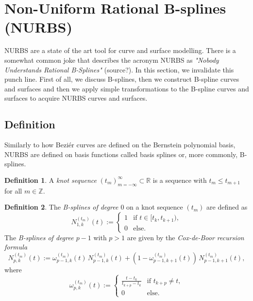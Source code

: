 \documentclass[a4paper, 11pt]{report}
\theoremstyle{definition}
\newtheorem{definition}{Definition}[section]
\renewcommand{\emph}[1]{\textit{#1}}
\begin{document}
\section{Non-Uniform Rational B-splines (NURBS)}
	NURBS are a state of the art tool for curve and surface modelling. There is a somewhat common joke that describes the acronym NURBS as \emph{"Nobody Understands Rational B-Splines"} (source?). In this section, we invalidate this punch line. First of all, we discuss B-splines, then we construct B-spline curves and surfaces and then we apply simple transformations to the B-spline curves and surfaces to acquire NURBS curves and surfaces.

\subsection{Definition}
	Similarly to how Beziér curves are defined on the Bernstein polynomial basis, NURBS are defined on basis functions called basis splines or, more commonly, B-splines.

	\begin{definition}
		A \emph{knot sequence} $(t_m)_{m=-\infty}^{\infty} \subset \mathbb{R}$ is a sequence with $t_{m} \leq t_{m+1}$ for all $m \in \mathbb{Z}$.
	\end{definition}

	\begin{definition}
		The \emph{B-splines of degree $0$} on a knot sequence $(t_m)$ are defined as
		\begin{equation}
			N^{(t_m)}_{1,k}(t) :=
			\begin{cases}
				1 & \text{if } t \in [t_k, t_{k+1}),\\
				0 & \text{else.}
			\end{cases}
		\end{equation}
		The \emph{B-splines of degree $p-1$} with $p > 1$ are given by the \emph{Cox-de-Boor recursion formula}
		\begin{equation}\label{eq:coxdeboorrec}
			N_{p,k}^{(t_m)}(t) := \omega^{(t_m)}_{p-1, k}(t) \, N^{(t_m)}_{p-1, k}(t) + (1-\omega^{(t_m)}_{p-1, k+1}(t)) \, N^{(t_m)}_{p-1, k+1}(t),
		\end{equation}
		where
		\begin{equation}
			\omega^{(t_m)}_{p,k}(t) := 
			\begin{cases}
				\frac{t-t_k}{t_{k+p} - t_k} &\text{if } t_{k+p} \neq t,\\
				0 							&\text{else.}
			\end{cases}
		\end{equation}
	\end{definition}
\end{document}
